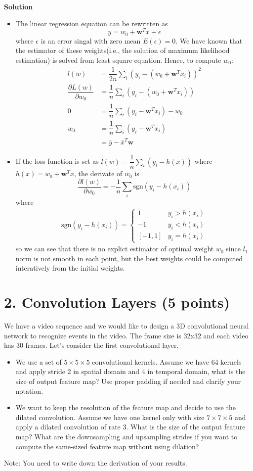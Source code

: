 \documentclass[12pt]{article}%
\begin{document}
\textbf{Solution}
\begin{itemize}
	\item The linear regression equation can be rewritten as 
	\[ y=w_0+\bm{w}^Tx+\epsilon \]
	where $ \epsilon $ is an error singal with zero mean $ E(\epsilon)=0 $.
	We have known that the estimator of these weights(i.e., the solution of maximum likelihood estimation) is solved from least square equation. Hence, to compute $ w_0 $:
	\begin{align*}
	l(w)&=\dfrac{1}{2n}\sum_{i}(y_i-(w_0+\bm{w}^Tx_i))^2\\
	\dfrac{\partial L(w)}{\partial w_0}&=\dfrac{1}{n}\sum_{i}(y_i-(w_0+\bm{w}^Tx_i))\\
	0&=\dfrac{1}{n}\sum_{i}(y_i-\bm{w}^Tx_i)-w_0\\
	w_0&=\dfrac{1}{n}\sum_{i}(y_i-\bm{w}^Tx_i)\\
	&=\bar{y}-\bar{x}^T\bm{w}
	\end{align*}
	\item If the loss function is set as $ l(w)=\dfrac{1}{n}\sum_{i}(y_i-h(x)) $ where $ h(x)=w_0+\bm{w}^Tx $, the derivate of $ w_0 $ is
	\[ \dfrac{\partial l(w)}{\partial w_0}=-\dfrac{1}{n}\sum_{i}\text{sgn}(y_i-h(x_i)) \]
	where\begin{align*}
	\text{sgn}(y_i-h(x_i))=\begin{cases}
	1&y_i>h(x_i)\\
	-1&y_i<h(x_i)\\
	[-1,1]&y_i=h(x_i)
	\end{cases}
	\end{align*}
	so we can see that there is no explict estimator of optimal weight $ w_0 $ since $ l_1 $ norm is not smooth in each point, but the best weights could be computed interatively from the initial weights.
\end{itemize}

\section*{2. Convolution Layers (5 points)}
We have a video sequence and we would like to design a 3D convolutional neural network to recognize events in the video. The frame size is 32x32 and each video has 30 frames. Let's consider the first convolutional layer.  
\begin{itemize}
	\item We use a set of $5\times 5\times 5$ convolutional kernels. Assume we have 64 kernels and apply stride 2 in spatial domain and 4 in temporal domain, what is the size of output feature map? Use proper padding if needed and clarify your notation.
	\item We want to keep the resolution of the feature map and decide to use the dilated convolution. Assume we have one kernel only with size $7\times 7\times 5$ and apply a dilated convolution of rate $3$. What is the size of the output feature map? What are the downsampling and upsampling strides if you want to compute the same-sized feature map without using dilation?   
\end{itemize}
Note: You need to write down the derivation of your results.
\end{document}
